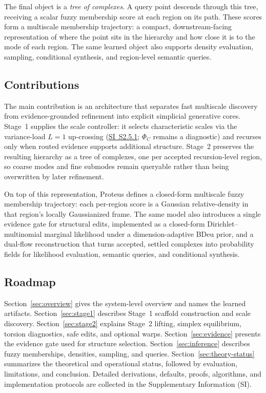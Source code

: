 \documentclass[11pt]{article}
\theoremstyle{definition}
\theoremstyle{plain}
\begin{document}
The final object is a \emph{tree of complexes}. A query point descends through this tree, receiving a scalar fuzzy membership score at each region on its path. These scores form a multiscale membership trajectory: a compact, downstream-facing representation of where the point sits in the hierarchy and how close it is to the mode of each region. The same learned object also supports density evaluation, sampling, conditional synthesis, and region-level semantic queries.

\subsection{Contributions}
The main contribution is an architecture that separates fast multiscale discovery from evidence-grounded refinement into explicit simplicial generative cores. Stage~1 supplies the scale controller: it selects characteristic scales via the variance-load $L=1$ up-crossing (\hyperref[sec:si-scale-response]{SI~S2.5.1}; $\Phi_C$ remains a diagnostic) and recurses only when routed evidence supports additional structure. Stage~2 preserves the resulting hierarchy as a tree of complexes, one per accepted recursion-level region, so coarse modes and fine submodes remain queryable rather than being overwritten by later refinement.

On top of this representation, Proteus defines a closed-form multiscale fuzzy membership trajectory: each per-region score is a Gaussian relative-density in that region's locally Gaussianized frame. The same model also introduces a single evidence gate for structural edits, implemented as a closed-form Dirichlet--multinomial marginal likelihood under a dimension-adaptive BDeu prior, and a dual-flow reconstruction that turns accepted, settled complexes into probability fields for likelihood evaluation, semantic queries, and conditional synthesis.

\subsection{Roadmap}
Section~\ref{sec:overview} gives the system-level overview and names the learned artifacts. Section~\ref{sec:stage1} describes Stage~1 scaffold construction and scale discovery. Section~\ref{sec:stage2} explains Stage~2 lifting, simplex equilibrium, torsion diagnostics, safe edits, and optional warps. Section~\ref{sec:evidence} presents the evidence gate used for structure selection. Section~\ref{sec:inference} describes fuzzy memberships, densities, sampling, and queries. Section~\ref{sec:theory-status} summarizes the theoretical and operational status, followed by evaluation, limitations, and conclusion. Detailed derivations, defaults, proofs, algorithms, and implementation protocols are collected in the Supplementary Information (SI).
\end{document}
